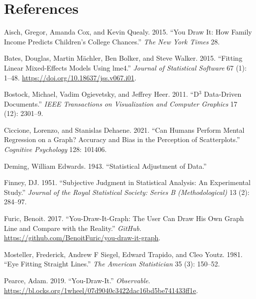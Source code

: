 \documentclass[
]{jds}
\newlength{\cslhangindent}
\newlength{\cslentryspacingunit} %
\newenvironment{CSLReferences}[2] %
 {%
  \setlength{\parindent}{0pt}
  \ifodd #1
  \let\oldpar\par
  \def\par{\hangindent=\cslhangindent\oldpar}
  \fi
  \setlength{\parskip}{#2\cslentryspacingunit}
 }%
 {}
\begin{document}
\hypertarget{references}{%
\section*{References}\label{references}}

\hypertarget{refs}{}
\begin{CSLReferences}{1}{0}
\leavevmode{}%
Aisch, Gregor, Amanda Cox, and Kevin Quealy. 2015. {``You Draw It: How
Family Income Predicts Children's College Chances.''} \emph{The New York
Times} 28.

\leavevmode{}%
Bates, Douglas, Martin Mächler, Ben Bolker, and Steve Walker. 2015.
{``Fitting Linear Mixed-Effects Models Using {lme4}.''} \emph{Journal of
Statistical Software} 67 (1): 1--48.
\url{https://doi.org/10.18637/jss.v067.i01}.

\leavevmode{}%
Bostock, Michael, Vadim Ogievetsky, and Jeffrey Heer. 2011. {``D\(^3\)
Data-Driven Documents.''} \emph{IEEE Transactions on Visualization and
Computer Graphics} 17 (12): 2301--9.

\leavevmode{}%
Ciccione, Lorenzo, and Stanislas Dehaene. 2021. {``Can Humans Perform
Mental Regression on a Graph? Accuracy and Bias in the Perception of
Scatterplots.''} \emph{Cognitive Psychology} 128: 101406.

\leavevmode{}%
Deming, William Edwards. 1943. {``Statistical Adjustment of Data.''}

\leavevmode{}%
Finney, DJ. 1951. {``Subjective Judgment in Statistical Analysis: An
Experimental Study.''} \emph{Journal of the Royal Statistical Society:
Series B (Methodological)} 13 (2): 284--97.

\leavevmode{}%
Furic, Benoit. 2017. {``You-Draw-It-Graph: The User Can Draw His Own
Graph Line and Compare with the Reality.''} \emph{GitHub}.
\url{https://github.com/BenoitFuric/you-draw-it-graph}.

\leavevmode{}%
Mosteller, Frederick, Andrew F Siegel, Edward Trapido, and Cleo Youtz.
1981. {``Eye Fitting Straight Lines.''} \emph{The American Statistician}
35 (3): 150--52.

\leavevmode{}%
Pearce, Adam. 2019. {``You-Draw-It.''} \emph{Observable}.
\url{https://bl.ocks.org/1wheel/07d9040c3422dac16bd5be741433ff1e}.


\end{CSLReferences}
\end{document}
